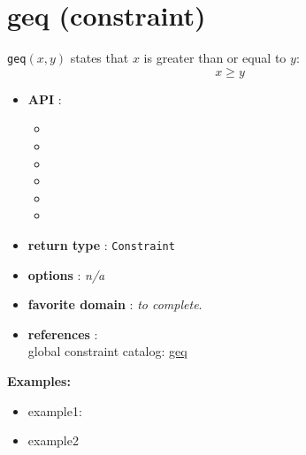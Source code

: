 \label{geq}
\hypertarget{geq}{}

\section{geq (constraint)}\label{geq:geqconstraint}\hypertarget{geq:geqconstraint}{}
\begin{notedef}
  \texttt{geq}$(x,y)$ states that $x$ is greater than or equal to $y$:
$$x\ge y$$
\end{notedef}

\begin{itemize}
	\item \textbf{API} :
	\begin{itemize}
		\item {}
		\item {}
		\item {}
		\item {}
		\item {}
		\item {}
	\end{itemize}
	\item \textbf{return type} : \texttt{Constraint}
	\item \textbf{options} : \emph{n/a}
	\item \textbf{favorite domain} : \emph{to complete}.
	\item \textbf{references} :\\
      global constraint catalog: \href{http://www.emn.fr/x-info/sdemasse/gccat/Cgeq.html}{geq}
\end{itemize}

\textbf{Examples:}
\begin{itemize}
	\item example1:
\end{itemize}



\begin{itemize}
	\item example2
\end{itemize}


